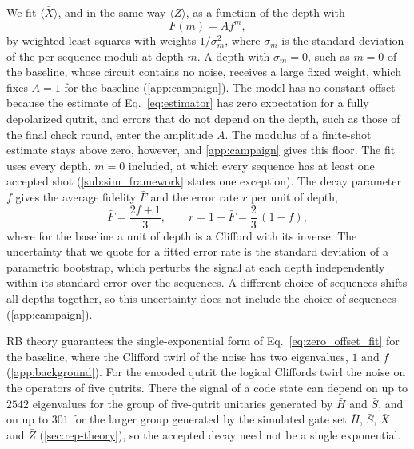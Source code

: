 We fit $\langle \bar{X} \rangle$, and in the same way $\langle Z \rangle$, as a function of the depth with
\begin{equation}
    F(m) = A f^{m},
    \label{eq:zero_offset_fit}
\end{equation}
by weighted least squares with weights $1/\sigma_m^2$, where $\sigma_m$ is the standard deviation of the per-sequence moduli at depth $m$. A depth with $\sigma_m = 0$, such as $m = 0$ of the baseline, whose circuit contains no noise, receives a large fixed weight, which fixes $A = 1$ for the baseline (\autoref{app:campaign}). The model has no constant offset because the estimate of Eq.~\eqref{eq:estimator} has zero expectation for a fully depolarized qutrit, and errors that do not depend on the depth, such as those of the final check round, enter the amplitude $A$. The modulus of a finite-shot estimate stays above zero, however, and \autoref{app:campaign} gives this floor. The fit uses every depth, $m = 0$ included, at which every sequence has at least one accepted shot (\autoref{sub:sim_framework} states one exception). The decay parameter $f$ gives the average fidelity $\bar F$ and the error rate $r$ per unit of depth,
\begin{equation}
    \bar{F} = \frac{2f + 1}{3}, \qquad r = 1 - \bar{F} = \frac{2}{3}\,(1 - f) ,
    \label{eq:error_rate}
\end{equation}
where for the baseline a unit of depth is a Clifford with its inverse. The uncertainty that we quote for a fitted error rate is the standard deviation of a parametric bootstrap, which perturbs the signal at each depth independently within its standard error over the sequences. A different choice of sequences shifts all depths together, so this uncertainty does not include the choice of sequences (\autoref{app:campaign}).

RB theory guarantees the single-exponential form of Eq.~\eqref{eq:zero_offset_fit} for the baseline, where the Clifford twirl of the noise has two eigenvalues, $1$ and $f$ (\autoref{app:background}). %
For the encoded qutrit the logical Cliffords twirl the noise on the operators of five qutrits. There the signal of a code state can depend on up to $2542$ eigenvalues for the group of five-qutrit unitaries generated by $\bar H$ and $\bar S$, and on up to $301$ for the larger group generated by the simulated gate set $\bar H$, $\bar S$, $\bar X$ and $\bar Z$ (\autoref{sec:rep-theory}), so the accepted decay need not be a single exponential.


